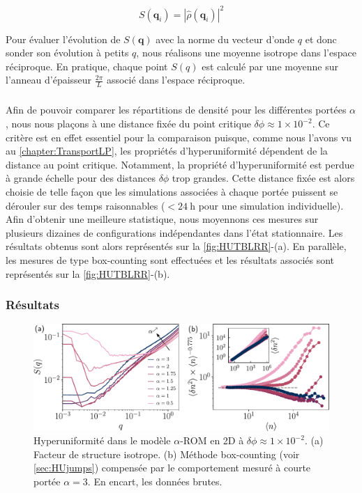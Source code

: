 \begin{equation}
	S(\mathbf{q}_i) = |\hat{\rho}(\mathbf{q}_i)|^2
\end{equation}

\noindent Pour évaluer l'évolution de $S(\mathbf{q})$ avec la norme du vecteur d'onde $q$ et donc sonder son évolution à petits $q$, nous réalisons une moyenne isotrope dans l'espace réciproque. En pratique, chaque point $S(q)$ est calculé par une moyenne sur l'anneau d'épaisseur $\frac{2\pi}{L}$ associé dans l'espace réciproque.

\subparagraph{}Afin de pouvoir comparer les répartitions de densité pour les différentes portées $\alpha$, nous nous plaçons à une distance fixée du point critique $\delta\phi \approx 1\times 10^{-2}$. Ce critère est en effet essentiel pour la comparaison puisque, comme nous l'avons vu au \autoref{chapter:TransportLP}, les propriétés d'hyperuniformité dépendent de la distance au point critique. Notamment, la propriété d'hyperuniformité est perdue à grande échelle pour des distances $\delta\phi$ trop grandes. Cette distance fixée est alors choisie de telle façon que les simulations associées à chaque portée puissent se dérouler sur des temps raisonnables ($<24~\text{h}$ pour une simulation individuelle). Afin d'obtenir une meilleure statistique, nous moyennons ces mesures sur plusieurs dizaines de configurations indépendantes dans l'état stationnaire. Les résultats obtenus sont alors représentés sur la \autoref{fig:HUTBLRR}-(a). En parallèle, les mesures de type box-counting sont effectuées et les résultats associés sont représentés sur la \autoref{fig:HUTBLRR}-(b).

\subsubsection{Résultats}

\begin{figure}[h]
	\centering
	\includegraphics[width=\textwidth]{Chapitre3/Figures/HU/HUTBLRR.pdf}
	\caption{Hyperuniformité dans le modèle $\alpha$-ROM en 2D à $\delta\phi \approx 1\times 10^{-2}$. (a) Facteur de structure isotrope. (b) Méthode box-counting (voir \autoref{sec:HUjumps}) compensée par le comportement mesuré à courte portée $\alpha = 3$. En encart, les données brutes.}
	\label{fig:HUTBLRR}
\end{figure}

